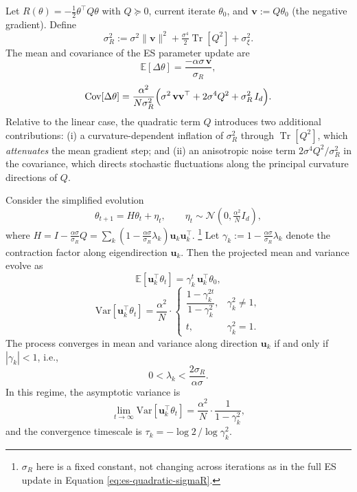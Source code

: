     
    \begin{proposition} \label{prop:quad_landscape_step}
    Let $R(\theta) = -\frac{1}{2}\theta^\top Q\theta$ with $Q \succeq 0$,
    current iterate $\theta_0$, and $\mathbf{v} := Q\theta_0$
    (the negative gradient). Define
    \[
        \sigma_R^2 := \sigma^2\|\mathbf{v}\|^2
                    + \tfrac{\sigma^4}{2}\operatorname{Tr}[Q^2]
                    + \sigma_\xi^2.
    \]
    The mean and covariance of the ES parameter update are
    \[
        \mathbb{E}[\Delta\theta]
        = \frac{-\alpha\sigma\,\mathbf{v}}{\sigma_R},
    \]
    \[
        \operatorname{Cov}[\Delta\theta]
        = \frac{\alpha^2}{N\sigma_R^2}
          \Bigl(
            \sigma^2\,\mathbf{v}\mathbf{v}^\top
            + 2\sigma^4 Q^2
            + \sigma_R^2\,I_d
          \Bigr).
    \]
    Relative to the linear case, the quadratic term $Q$ introduces two
    additional contributions: (i) a curvature-dependent inflation of
    $\sigma_R^2$ through $\operatorname{Tr}[Q^2]$, which \emph{attenuates}
    the mean gradient step; and (ii) an anisotropic noise term
    $2\sigma^4 Q^2/\sigma_R^2$ in the covariance, which directs
    stochastic fluctuations along the principal curvature directions
    of $Q$.
    \end{proposition}
    
    
    \begin{proposition} \label{prop:quad_landscape_dynamics}
      Consider the simplified evolution
      \[
      \theta_{t+1} = H\theta_t + \eta_t, \qquad \eta_t \sim \mathcal{N}\!\left(0,\tfrac{\alpha^2}{N}I_d\right),
      \]
      where $H = I - \frac{\alpha\sigma}{\sigma_R}Q = \sum_k \left(1 - \frac{\alpha\sigma}{\sigma_R}\lambda_k\right)\mathbf{u}_k\mathbf{u}_k^\top$. 
      \footnote{$\sigma_R$ here is a fixed constant, not changing across iterations as in the full ES update in Equation \ref{eq:es-quadratic-sigmaR}.}
      Let $\gamma_k := 1 - \frac{\alpha\sigma}{\sigma_R}\lambda_k$ denote the contraction factor along eigendirection $\mathbf{u}_k$. Then the projected mean and variance evolve as
      \[
      \mathbb{E}[\mathbf{u}_k^\top\theta_t] = \gamma_k^t\,\mathbf{u}_k^\top\theta_0,
      \]
      \[
      \mathrm{Var}[\mathbf{u}_k^\top\theta_t] = \frac{\alpha^2}{N}\cdot\begin{cases} \dfrac{1 - \gamma_k^{2t}}{1-\gamma_k^2}, & \gamma_k^2 \neq 1, \\[6pt] t, & \gamma_k^2 = 1. \end{cases}
      \]
      The process converges in mean and variance along direction $\mathbf{u}_k$ if and only if $|\gamma_k| < 1$, i.e.,
      \[
      0 < \lambda_k < \frac{2\sigma_R}{\alpha\sigma}.
      \]
      In this regime, the asymptotic variance is
      \[
      \lim_{t\to\infty}\mathrm{Var}[\mathbf{u}_k^\top\theta_t] = \frac{\alpha^2}{N}\cdot\frac{1}{1-\gamma_k^2},
      \]
      and the convergence timescale is $\tau_k = -\log 2\,/\log\gamma_k^2$.
      \end{proposition}
      
